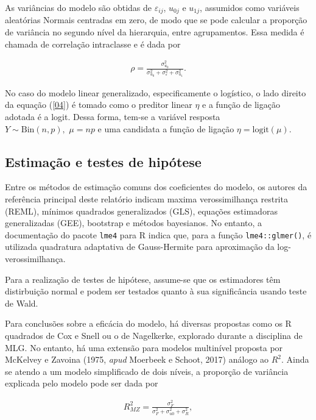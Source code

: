 \documentclass[
  letterpaper,
  DIV=11,
  numbers=noendperiod]{scrartcl}
\begin{document}
As variâncias do modelo são obtidas de \(\varepsilon_{ij}\), \(u_{0j}\)
e \(u_{1j}\), assumidos como variáveis aleatórias Normais centradas em
zero, de modo que se pode calcular a proporção de variância no segundo
nível da hierarquia, entre agrupamentos. Essa medida é chamada de
correlação intraclasse e é dada por

\begin{align}
  \rho = \frac{\sigma^2_{u_0}}{\sigma^2_{u_0}+\sigma^2_{\varepsilon}+\sigma^2_{u_1}}.
\end{align}

No caso do modelo linear generalizado, especificamente o logístico, o
lado direito da equação (\ref{04}) é tomado como o preditor linear
\(\eta\) e a função de ligação adotada é a logit. Dessa forma, tem-se a
variável resposta \(Y\sim \text{Bin}(n,p), \,\, \mu = np\) e uma
candidata a função de ligação \(\eta = \text{logit}(\mu)\).

\hypertarget{estimauxe7uxe3o-e-testes-de-hipuxf3tese}{%
\subsection{Estimação e testes de
hipótese}\label{estimauxe7uxe3o-e-testes-de-hipuxf3tese}}

Entre os métodos de estimação comuns dos coeficientes do modelo, os
autores da referência principal deste relatório indicam maxima
verossimilhança restrita (REML), mínimos quadrados generalizados (GLS),
equações estimadoras generalizadas (GEE), bootstrap e métodos
bayesianos. No entanto, a documentação do pacote \texttt{lme4} para R
indica que, para a função \texttt{lme4::glmer()}, é utilizada quadratura
adaptativa de Gauss-Hermite para aproximação da log-verossimilhança.

Para a realização de testes de hipótese, assume-se que os estimadores
têm distirbuição normal e podem ser testados quanto à sua significância
usando teste de Wald.

Para conclusões sobre a eficácia do modelo, há diversas propostas como
os R quadrados de Cox e Snell ou o de Nagelkerke, explorado durante a
disciplina de MLG. No entanto, há uma extensão para modelos multinível
proposta por McKelvey e Zavoina (1975, \emph{apud} Moerbeek e Schoot,
2017) análogo ao \(R^2\). Ainda se atendo a um modelo simplificado de
dois níveis, a proporção de variância explicada pelo modelo pode ser
dada por

\begin{align}
    R^2_{MZ} = \frac{\sigma^2_{F}}{\sigma^2_{F}+\sigma^2_{u0}+\sigma^2_{R}},
\end{align}
\end{document}
